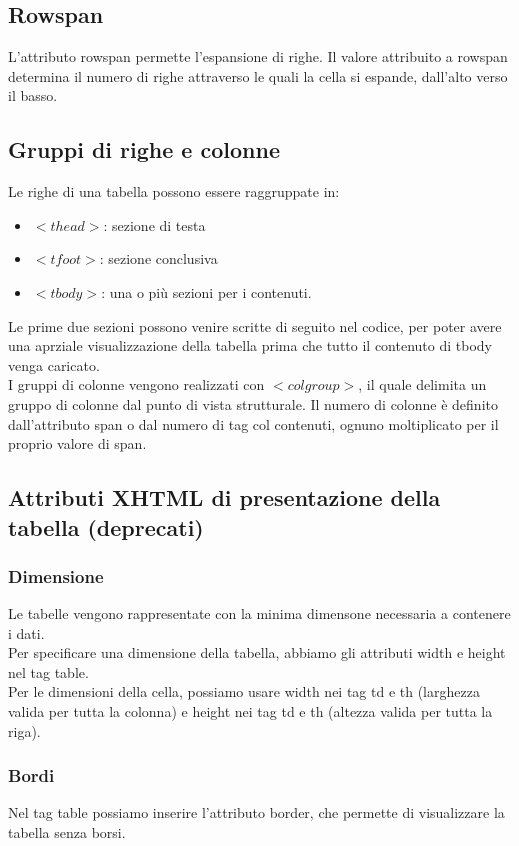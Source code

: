 \documentclass{article}
\begin{document}
\subsection{Rowspan}
L'attributo rowspan permette l'espansione di righe. Il valore attribuito a rowspan determina il numero di righe attraverso le quali la cella si espande, dall'alto verso il basso.
\subsection{Gruppi di righe e colonne}
Le righe di una tabella possono essere raggruppate in:
\begin{itemize}
	\item $<thead>$: sezione di testa
	\item $<tfoot>$: sezione conclusiva
	\item $<tbody>$: una o più sezioni per i contenuti.
\end{itemize}
Le prime due sezioni possono venire scritte di seguito nel codice, per poter avere una aprziale visualizzazione della tabella prima che tutto il contenuto di tbody venga caricato.\\
I gruppi di colonne vengono realizzati con $<colgroup>$, il quale delimita un gruppo di colonne dal punto di vista strutturale. Il numero di colonne è definito dall'attributo span o dal numero di tag col contenuti, ognuno moltiplicato per il proprio valore di span.
\subsection{Attributi XHTML di presentazione della tabella (deprecati)}
\subsubsection{Dimensione}
Le tabelle vengono rappresentate con la minima dimensone necessaria a contenere i dati.\\
Per specificare una dimensione della tabella, abbiamo gli attributi width e height nel tag table.\\
Per le dimensioni della cella, possiamo usare width nei tag td e th (larghezza valida per tutta la colonna) e height nei tag td e th (altezza valida per tutta la riga).
\subsubsection{Bordi}
Nel tag table possiamo inserire l'attributo border, che permette di visualizzare la tabella senza borsi.
\end{document}
